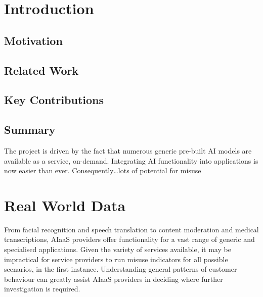 \documentclass[a4paper,12pt]{report}
\begin{document}
	
	
	\pagestyle{empty}
	\singlespacing
	
	\onehalfspacing
	
	\singlespacing
	
	
	\setcounter{page}{0}
	\pagestyle{plain}
	\tableofcontents
	\listoffigures
	\listoftables
	
	\onehalfspacing
	
	
	\chapter{Introduction}
	\setcounter{page}{1} 
	
	\section{Motivation}
	
	\section{Related Work}
	
	\section{Key Contributions}
	
	\section{Summary}
	The project is driven by the fact that numerous generic pre-built AI models are available as a service, on-demand. Integrating AI functionality into applications is now easier than ever. Consequently…lots of potential for misuse
	
	
	\chapter{Real World Data}
	From facial recognition and speech translation to content moderation and medical transcriptions, AIaaS providers offer functionality for a vast range of generic and specialised applications. Given the variety of services available, it may be impractical for service providers to run misuse indicators for all possible scenarios, in the first instance. Understanding general patterns of customer behaviour can greatly assist AIaaS providers in deciding where further investigation is required. 
	
\end{document}
